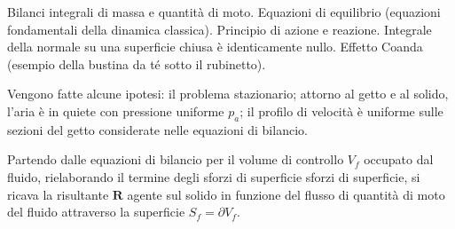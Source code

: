 \documentclass[letterpaper,10pt,italian]{jupyterBook}
\begin{document}
\sphinxAtStartPar
Bilanci integrali di massa e quantità di moto. Equazioni di equilibrio
(equazioni fondamentali della dinamica classica). Principio di azione e
reazione. Integrale della normale su una superficie chiusa è
identicamente nullo. Effetto Coanda (esempio della bustina da té sotto
il rubinetto).

\sphinxAtStartPar
Vengono fatte alcune ipotesi: il problema stazionario; attorno al getto
e al solido, l’aria è in quiete con pressione uniforme \(p_a\); il profilo
di velocità è uniforme sulle sezioni del getto considerate nelle
equazioni di bilancio.

\sphinxAtStartPar
Partendo dalle equazioni di bilancio per il volume di controllo \(V_{f}\)
occupato dal fluido, rielaborando il termine degli sforzi di superficie
sforzi di superficie, si ricava la risultante \(\bm{R}\) agente sul solido
in funzione del flusso di quantità di moto del fluido attraverso la
superficie \(S_{f} = \partial V_f\).
\end{document}
